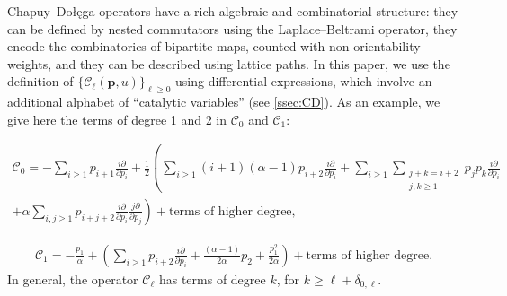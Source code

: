 \documentclass[12pt]{amsart}
\theoremstyle{remark}
\newcommand{\bfp}{\boldsymbol{p}}
\newcommand{\C}{\mathcal C}
\begin{document}
Chapuy--Do\l{}e\k{}ga operators have a rich algebraic and combinatorial structure: they can be defined by nested commutators using the Laplace--Beltrami operator, they encode the combinatorics of bipartite maps, counted with non-orientability weights, and they can be described using lattice paths. 
In this paper, we use the definition of $\{\C_\ell(\bfp,u)\}_{\ell\geq 0}$ using differential expressions, which involve an additional alphabet of ``catalytic variables'' (see \cref{ssec:CD}). As an example, we give here the terms of degree 1 and 2 in $\C_0$ and $\C_1$:

\begin{multline*}
\C_0=-\sum_{i\geq 1}p_{i+1}\frac{i \partial}{\partial p_i}+\frac{1}{2}\left(\sum_{i\geq 1}(i+1)(\alpha-1) p_{i+2}\frac{i \partial}{\partial p_i}+\sum_{i\geq 1}\sum_{\substack{j+k=i+2\\j,k\geq 1}}p_{j}p_k\frac{i \partial}{\partial p_i}\right.\\
\left.+\alpha\sum_{i,j\geq 1}p_{i+j+2}\frac{i\partial}{\partial p_i} \frac{j\partial}{\partial p_j} \right)
  +\text{terms of higher degree},
\end{multline*}

\begin{align*}
\C_1=-\frac{p_1}{\alpha}+\left(\sum_{i\geq 1}p_{i+2}\frac{i\partial}{\partial p_i}+\frac{(\alpha-1)}{2\alpha}p_2+\frac{p_1^2}{2\alpha}\right)+\text{terms of higher degree}.
\end{align*}
In general, the operator $\C_\ell$ has terms of degree $k$, for $k\geq \ell+\delta_{0,\ell}$.
\end{document}
